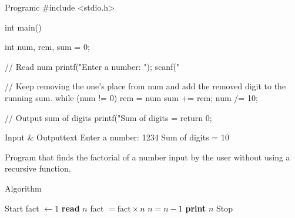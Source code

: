 \documentclass[11pt]{ipu-c}
\begin{document}
    \newpage
    \begin{code}
        {Program}{c}
#include <stdio.h>

int main() {
    int num, rem, sum = 0;

    // Read num
    printf("Enter a number: ");
    scanf("%

    // Keep removing the one's place from num and add the removed digit to the running sum.
    while (num != 0) {
        rem = num %
        sum += rem;
        num /= 10;
    }

    // Output sum of digits
    printf("Sum of digits = %
    return 0;
}
    \end{code}
    \begin{code}
        {Input \& Output}{text}
Enter a number: 1234
Sum of digits = 10
    \end{code}


    {Program that finds the factorial of a number input by the user without using a recursive function.}

    \begin{tabularsection}{Algorithm}
        \begin{algorithmic}[1]
            \State Start
            \State fact $\gets 1$
            \State \textbf{read} $n$
                \State fact $= \text{fact} \times n$
                \State $n = n - 1$
            \EndWhile
            \State \textbf{print} $n$
            \State Stop
        \end{algorithmic}
    \end{tabularsection}
\end{document}
